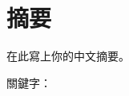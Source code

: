 \documentclass[class=FJU_thesis, crop=false]{standalone}
\begin{document}
\chapter{摘要}
在此寫上你的中文摘要。

\vspace{2em}
\noindent 關鍵字： \keywordsZh{} %
\end{document}
